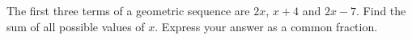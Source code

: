 The first three terms of a geometric sequence are $2x$, $x+4$ and $2x-7$. Find the sum of all possible values of $x$. Express your answer as a common fraction.
